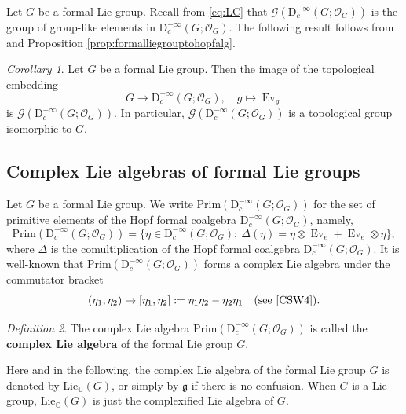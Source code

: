 \documentclass[12pt, a4paper]{amsart}
\newcommand{\BC}{{\mathbb {C}}}
\newcommand{\CG}{{\mathcal {G}}}
\newcommand{\CO}{{\mathcal {O}}}
\newcommand{\RD}{{\mathrm {D}}}
\newcommand{\Lie}{{\mathrm{Lie}}}
\newcommand{\Ev}{\operatorname{Ev}}
\newcommand{\g}{\mathfrak g}
\newcommand{\be}{\begin {equation}}
\newcommand{\ee}{\end {equation}}
\theoremstyle{Theorem}
\theoremstyle{Theorem}
\theoremstyle{Theorem}
\theoremstyle{Theorem}
\theoremstyle{Plain}
\theoremstyle{remark}
\theoremstyle{remark}
\theoremstyle{Definition}
\newtheorem{dfn}{Definition}[section]
\newtheorem{cord}[dfn]{Corollary}
\numberwithin{equation}{section}
\begin{document}
Let $G$ be a formal Lie group. Recall from \eqref{eq:LC} that $\CG(\RD^{-\infty}_c(G;\CO_G))$ is the group of group-like elements in $\RD^{-\infty}_c(G;\CO_G)$.
The following result follows from \cite[Proposition 5.5]{CSW1} and Proposition \ref{prop:formalliegrouptohopfalg}.
\begin{cord}\label{cor:Gembed}
Let $G$ be a formal Lie group. Then the image of the topological  embedding 
\be\label{eq:DiracG} G\rightarrow  \RD^{-\infty}_c(G;\CO_G),\quad g\mapsto \Ev_g \ee is $\CG(\RD^{-\infty}_c(G;\CO_G))$.  In particular, 
$\CG(\RD^{-\infty}_c(G;\CO_G))$ is a topological group isomorphic to $G$.
\end{cord}

\subsection{Complex Lie algebras of formal Lie groups} 

Let $G$ be a formal Lie group. We write $\mathrm{Prim}(\RD^{-\infty}_c(G;\CO_G))$ for the set of primitive elements of the Hopf formal coalgebra $\RD^{-\infty}_c(G;\CO_G)$, namely,
\be \label{eq:Prim}
\mathrm{Prim}(\RD^{-\infty}_c(G;\CO_G))=\{\eta\in \RD^{-\infty}_c(G;\CO_G):\ \Delta(\eta)=\eta\otimes \Ev_e+\Ev_e\otimes \eta\},
\ee  where $\Delta$ is the comultiplication of the Hopf formal coalgebra $\RD^{-\infty}_c(G;\CO_G)$. 
It is well-known that $\mathrm{Prim}(\RD^{-\infty}_c(G;\CO_G))$ forms a complex Lie algebra under the commutator bracket
\[(\eta_1,\eta_2)\mapsto [\eta_1,\eta_2]:=\eta_1\eta_2-\eta_2\eta_1 \quad\text{(see \cite[(2.19)]{CSW4})}. \]

\begin{dfn}
     The complex Lie algebra  $\mathrm{Prim}(\RD^{-\infty}_c(G;\CO_G))$ is called the \textbf{complex Lie algebra} of the formal Lie group $G$.
\end{dfn}
Here and in the following, 
the complex Lie algebra of the formal Lie group $G$ is denoted by $\Lie_{\BC}(G)$, or simply by $\g$ if there is no confusion.  
When $G$ is a Lie group,  $\Lie_{\BC}(G)$ is just the complexified Lie algebra of $G$. %
\end{document}
